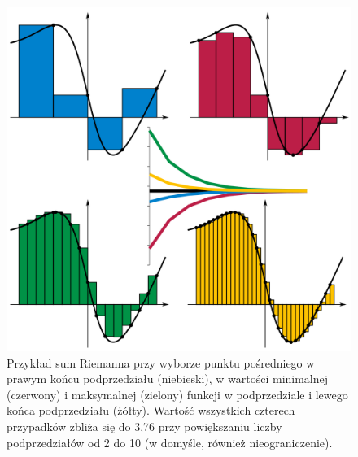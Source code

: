 \documentclass[a4paper,11pt,fleqn]{article}
\begin{document}
\begin{figure}
\begin{framed}
\begin{center}

\includegraphics[width=\textwidth]{Plik_Riemann_sum_convergence.png}
\end{center}
\begin{flushleft}
\caption*{
\small
Przykład sum Riemanna przy wyborze punktu pośredniego w prawym końcu podprzedziału (niebieski), w wartości minimalnej (czerwony) i maksymalnej (zielony) funkcji w podprzedziale i lewego końca podprzedziału (żółty). Wartość wszystkich czterech przypadków zbliża się do 3,76 przy powiększaniu liczby podprzedziałów od 2 do 10 (w domyśle, również nieograniczenie).}
\end{flushleft}
\end{framed}
\end{figure}
\end{document}
